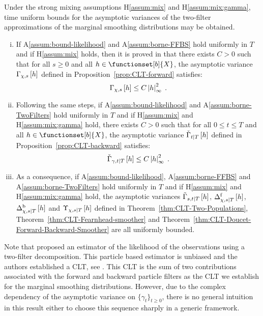 \begin{rem}
Under the strong mixing assumptions H\ref{assum:mix} and H\ref{assum:mix:gamma}, time uniform bounds for the asymptotic variances of  the two-filter approximations of the marginal smoothing distributions may be obtained.
\begin{enumerate}[(i)]
\item If A\ref{assum:bound-likelihood} and A\ref{assum:borne-FFBS} hold uniformly in $T$ and if H\ref{assum:mix} holds, then it is proved in \cite{douc:garivier:moulines:olsson:2011} that there exists $C>0$ such that for all $s \geq 0$ and all $h \in \functionset[b]{X}$, the asymptotic variance $\asymVar[\Xinit]{s}{h}$ defined in Proposition~\ref{prop:CLT-forward} satisfies:
\[
\asymVar[\Xinit]{s}{h} \le C \esssup{h}^2\eqsp.
\]
\item Following the same steps, if A\ref{assum:bound-likelihood} and A\ref{assum:borne-TwoFilters} hold uniformly in $T$  and if H\ref{assum:mix} and H\ref{assum:mix:gamma} hold, there exists $C>0$ such that for all $0\le t\le T$ and all $h \in \functionset[b]{X}$, the asymptotic variance $\backasymVar{t}{T}{h}$ defined in Proposition~\ref{prop:CLT-backward} satisfies:
\[
\backasymVar[\gamma]{t}{T}{h}\le C \esssup{h}^2\eqsp.
\]
\item As a consequence, if A\ref{assum:bound-likelihood}, A\ref{assum:borne-FFBS} and A\ref{assum:borne-TwoFilters} hold uniformly in $T$  and  if H\ref{assum:mix} and H\ref{assum:mix:gamma} hold, the asymptotic variances $\asymVarJoint{s,t}{T}{h}$, $\asymVarDoucet[\Xinit]{\forward}{s}{T}{h}$, $\asymVarDoucet[\Xinit]{\backward}{s}{T}{h}$ and $\asymVarFearnhead[\Xinit]{s}{T}{h}$ defined in Theorem~\ref{thm:CLT-Two-Populations}, Theorem~\ref{thm:CLT-Fearnhead-smoother}  and Theorem~\ref{thm:CLT-Doucet-Forward-Backward-Smoother} are all uniformly bounded.
\end{enumerate}
\end{rem}
Note that \cite{persing:jasra:2013} proposed an estimator of the likelihood of the observations using a two-filter decomposition. This particle based estimator is unbiased and the authors established a CLT, see \cite[Theorem~2.1]{persing:jasra:2013}. This CLT is the sum of two contributions associated with the forward and backward particle filters as the CLT we establish for the marginal smoothing distributions. However, due to the complex dependency of the asymptotic variance on $\{\gamma_t\}_{t\ge 0}$, there is no general intuition in this result either to choose this sequence sharply in a generic framework.
